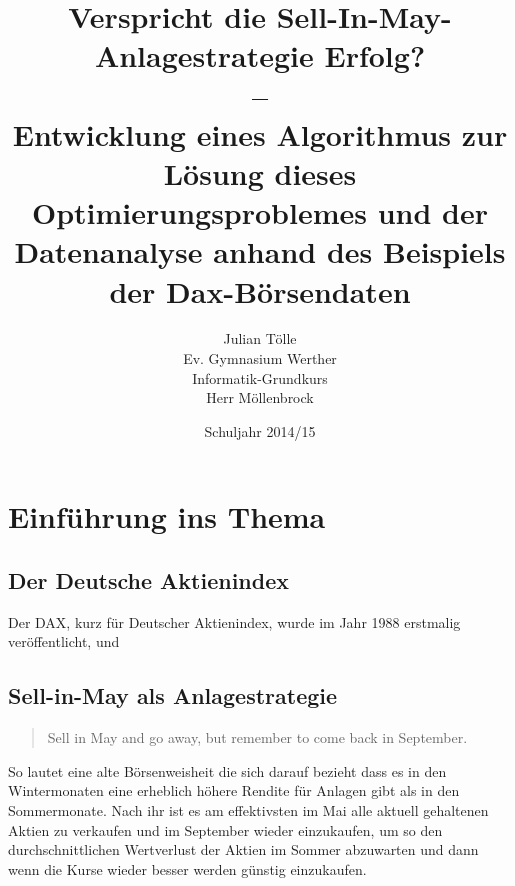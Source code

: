 \documentclass[12pt, a4paper, titlepage]{report}
\begin{document}
    \begin{titlepage}
        \title{Verspricht die Sell-In-May-Anlagestrategie Erfolg?\\
                –\\
                Entwicklung eines Algorithmus zur Lösung dieses Optimierungsproblemes
                und der Datenanalyse anhand des Beispiels der Dax-Börsendaten}
        \author{Julian Tölle\\
                Ev. Gymnasium Werther\\
                Informatik-Grundkurs\\
                Herr Möllenbrock}
        \date{Schuljahr 2014/15}

        \maketitle
    \end{titlepage}

    \tableofcontents
    \thispagestyle{empty}

    \setcounter{page}{2}

    \chapter{Einführung ins Thema}
        
        \section{Der Deutsche Aktienindex}
            Der DAX, kurz für Deutscher Aktienindex, wurde im Jahr 1988 erstmalig veröffentlicht,
            und

        \section{Sell-in-May als Anlagestrategie}
            \begin{quote}
                Sell in May and go away, but remember to come back in September.
            \end{quote}
            So lautet eine alte Börsenweisheit die sich darauf bezieht dass es
            in den Wintermonaten eine erheblich höhere Rendite für Anlagen gibt
            als in den Sommermonate. Nach ihr ist es am effektivsten im Mai alle
            aktuell gehaltenen Aktien zu verkaufen und im September wieder
            einzukaufen, um so den durchschnittlichen Wertverlust der Aktien im
            Sommer abzuwarten und dann wenn die Kurse wieder besser werden
            günstig einzukaufen.
\end{document}
